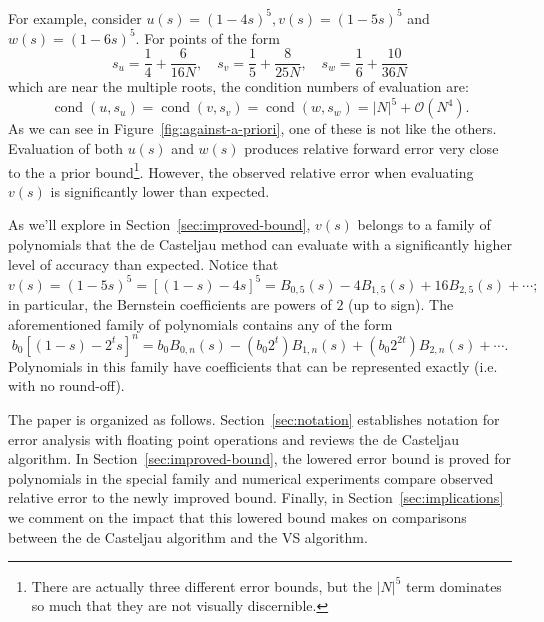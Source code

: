 \documentclass[letterpaper,10pt]{article}
\theoremstyle{definition}
\newcommand{\cond}[1]{\operatorname{cond}\left(#1\right)}
\newcommand{\bigO}[1]{\mathcal{O}\left(#1\right)}
\begin{document}
For example, consider \(u(s) = (1 - 4s)^5, v(s) = (1 - 5s)^5\) and
\(w(s) = (1 - 6s)^5\). For points of the form
\begin{equation}
s_u = \frac{1}{4} + \frac{6}{16N}, \quad
s_v = \frac{1}{5} + \frac{8}{25N}, \quad
s_w = \frac{1}{6} + \frac{10}{36N}
\end{equation}
which are near the multiple roots, the condition numbers of evaluation are:
\begin{equation}
\cond{u, s_u} = \cond{v, s_v} = \cond{w, s_w} =
  \left|N\right|^5 + \bigO{N^4}.
\end{equation}
As we can see in Figure~\ref{fig:against-a-priori}, one of these is not
like the others. Evaluation of both \(u(s)\) and \(w(s)\) produces
relative forward error very close to the a prior bound\footnote{There
are actually three different error bounds, but the \(\left|N\right|^5\)
term dominates so much that they are not visually discernible.}. However,
the observed relative error when evaluating \(v(s)\) is significantly
lower than expected.

As we'll explore in Section~\ref{sec:improved-bound}, \(v(s)\) belongs
to a family of polynomials that the de Casteljau method can evaluate with
a significantly higher level of accuracy than expected. Notice that
\begin{equation}
v(s) = (1 - 5s)^5 = \left[(1 - s) - 4s\right]^5 =
  B_{0, 5}(s) - 4 B_{1, 5}(s) +
  16 B_{2, 5}(s) + \cdots;
\end{equation}
in particular, the Bernstein coefficients are powers of \(2\) (up to sign).
The aforementioned family of polynomials contains any of the form
\begin{equation}
b_0 \left[(1 - s) - 2^t s\right]^n =
  b_0 B_{0, n}(s) - \left(b_0 2^t\right) B_{1, n}(s) +
  \left(b_0 2^{2t}\right) B_{2, n}(s) + \cdots.
\end{equation}
Polynomials in this family have coefficients that can be represented
exactly (i.e. with no round-off).

The paper is organized as follows. Section~\ref{sec:notation} establishes
notation for error analysis with floating point operations and reviews the
de Casteljau algorithm. In
Section~\ref{sec:improved-bound}, the lowered error bound is proved
for polynomials in the special family and numerical experiments compare
observed relative error to the newly improved bound.
Finally, in Section~\ref{sec:implications} we comment on the impact
that this lowered bound makes on comparisons between the de Casteljau
algorithm and the VS algorithm.
\end{document}
